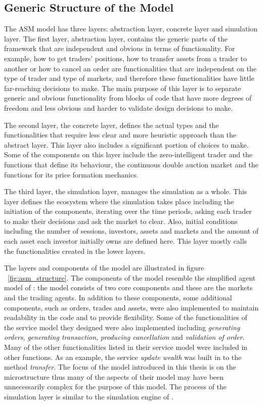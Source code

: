 \subsection{Generic Structure of the Model}
The ASM model has three layers: abstraction layer, concrete 
layer and simulation layer. The first layer, abstraction layer, contains the 
generic parts of the framework that are independent and obvious in terms
of functionality. For example, how to get traders' positions, how to
transfer assets from a trader to another or how to cancel an order are
functionalities that are independent on the type of trader 
and type of markets, and therefore these functionalities have little
far-reaching decisions to make. The main purpose of this layer
is to separate generic and obvious functionality from blocks of code
that have more degrees of freedom and less obvious and harder to validate 
design decisions to make.

The second layer, the concrete layer, defines the actual types and the
functionalities that require less clear and more heuristic
approach than the abstract layer. This layer also includes a significant
portion of choices to make. Some of the components
on this layer include the zero-intelligent trader and the
functions that define its behaviour, the continuous double auction
market and the functions for its price formation mechanics.

The third layer, the simulation layer, manages the simulation as a whole.
This layer defines the ecosystem where the simulation takes place including
the initiation of the components, iterating over the time periods, asking
each trader to make their decisions and ask the market to clear. 
Also, initial conditions including the number of sessions, investors, assets and markets
and the amount of each asset each investor initially owns are defined here. 
This layer mostly calls the functionalities created in the lower layers.

The layers and components of the model are illustrated in figure ~\ref{fig:asm_structure}.
The components of the model resemble the simplified agent model of \citet{Ben12}: the model consists of 
two core components and these are the markets and the trading agents. In addition to these components, 
some additional components, such as orders, trades and assets, were also implemented to maintain readability 
in the code and to provide flexibility. Some of the functionalities 
of the service model they designed were also implemented including \textit{generating orders}, 
\textit{generating transaction}, \textit{producing cancellation} and \textit{validation of order}. 
Many of the other functionalities listed in their service model were included in other functions.
As an example, the service \textit{update wealth} was built in to the method 
\textit{transfer}. The focus of the model introduced in this thesis is on the microstructure 
thus many of the aspects of their model may have been unnecessarily complex for the purpose 
of this model. The process of the simulation layer is similar to the simulation engine of 
\citet{Julien07}.

